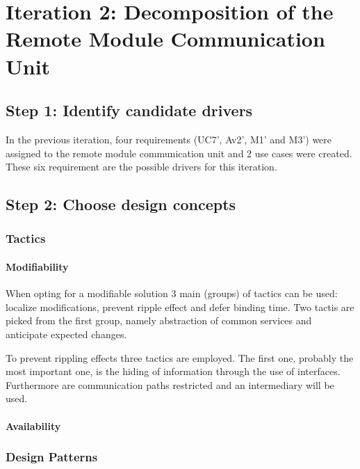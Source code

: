 \section{Iteration 2: Decomposition of the Remote Module Communication Unit}
\label{add:it2}

\subsection{Step 1: Identify candidate drivers}
\label{add:it2/drivers}

\npar In the previous iteration, four requirements (UC7', Av2', M1' and M3')
were assigned to the remote module communication unit and 2 use cases were
created. These six requirement are the possible drivers for this iteration.

\subsection{Step 2: Choose design concepts}
\label{add:it2/concepts}

\subsubsection{Tactics}
\label{add:it2/tactics}

\paragraph{Modifiability}

\npar When opting for a modifiable solution 3 main (groups) of tactics can be
used: localize modifications, prevent ripple effect and defer binding time.
Two tactis are picked from the first group, namely abstraction of common
services and anticipate expected changes.

\npar To prevent rippling effects three tactics are employed. The first one,
probably the most important one, is the hiding of information through the use of
interfaces. Furthermore are communication paths restricted and an intermediary
will be used.

\paragraph{Availability}


\subsubsection{Design Patterns}
\label{add:it2/patterns}

